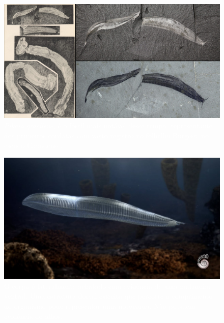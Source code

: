 \documentclass[aspectratio=169]{beamer} %
\begin{document}
{\begin{frame}
    \begin{minipage}{0.5\textwidth}
	    \begin{figure}
	\centering
        \includegraphics[scale=0.1]{images/faunacambriana3.jpg} %
		    \caption{\textcolor{white}{\textit{Pikaia gracilens}, é o fóssil mais notável desse tempo, representante dos primeiros cordatas com vasto registro no folhelho Burgess, no escudo Canadense.}} %
	    \end{figure}
    \end{minipage}%
		\pause
    \begin{minipage}{0.5\textwidth}
	    \begin{figure}
        \centering
        \includegraphics[scale=0.15]{images/faunacambriana2.jpg} %
		    \caption{\textcolor{white}{O corpo é lateralmente achatado com evidência de uma nadadeira ventral. Uma estrutura dorsal estreita que percorre o comprimento do organismo pode representar uma notocorda. Não possuem evidência de olhos.}} %
	    \end{figure}
    \end{minipage}

\flushright
		\textcolor{blue}{\citep{Briggs2015}}
		
	\end{frame}
}
\end{document}

